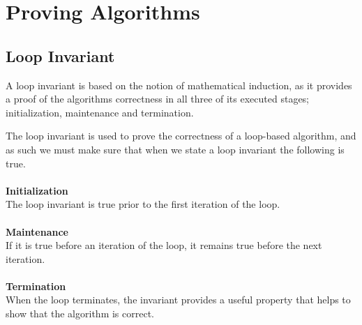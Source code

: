 
\thispagestyle{fancyplain}

\chapter{Proving Algorithms}
\label{ch:proofs}

\section{Loop Invariant}
\label{ch:proofs|sec:loop-invariant}
A loop invariant is based on the notion of mathematical induction, as it
provides a proof of the algorithms correctness in all three of its executed
stages; initialization, maintenance and termination.

The loop invariant is used to prove the correctness of a loop-based algorithm,
and as such we must make sure that when we state a loop invariant the
following is true.
\\\\
\textbf{Initialization}
\label{ch:proofs|sec:loop-invariant|sub:initialization}\\
The loop invariant is true prior to the first iteration of the loop.
\\\\
\textbf{Maintenance}
\label{ch:proofs|sec:loop-invariant|sub:maintenance}\\
If it is true before an iteration of the loop, it remains true before the next
iteration.
\\\\
\textbf{Termination}
\label{ch:proofs|sec:loop-invariant|sub:termination}\\
When the loop terminates, the invariant provides a useful property that helps
to show that the algorithm is correct.

